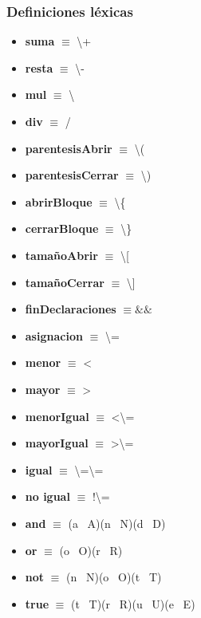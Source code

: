 \documentclass[11pt]{article}
\begin{document}
        \subsubsection*{Definiciones léxicas}
        \begin{itemize}
            \item \textbf{suma }$\equiv$ \textbackslash+
            \item \textbf{resta }$\equiv$ \textbackslash-
            \item \textbf{mul }$\equiv$ \textbackslash*
            \item \textbf{div }$\equiv$ /
            \item \textbf{parentesisAbrir }$\equiv$ \textbackslash(
            \item \textbf{parentesisCerrar }$\equiv$ \textbackslash)
            \item \textbf{abrirBloque }$\equiv$ \textbackslash\{
            \item \textbf{cerrarBloque }$\equiv$ \textbackslash\}
            \item \textbf{tamañoAbrir  }$\equiv$ \textbackslash[
            \item \textbf{tamañoCerrar }$\equiv$ \textbackslash]
            \item \textbf{finDeclaraciones }$\equiv \&\& $
            \item \textbf{asignacion }$\equiv$ \textbackslash=
            \item \textbf{menor }$\equiv$ \textless
            \item \textbf{mayor }$\equiv$ \textgreater
            \item \textbf{menorIgual }$\equiv$ \textless\textbackslash=
            \item \textbf{mayorIgual }$\equiv$ \textgreater\textbackslash=
            \item \textbf{igual }$\equiv$ \textbackslash=\textbackslash=
            \item \textbf{no igual }$\equiv$ !\textbackslash=
            \item \textbf{and }$\equiv$ (a \textbar\ A)(n \textbar\ N)(d \textbar\ D)
            \item \textbf{or }$\equiv$ (o \textbar\ O)(r \textbar\ R)
            \item \textbf{not }$\equiv$ (n \textbar\ N)(o \textbar\ O)(t \textbar\ T)
            \item \textbf{true }$\equiv$ (t \textbar\ T)(r \textbar\ R)(u \textbar\ U)(e \textbar\ E)

\end{itemize}
\end{document}
